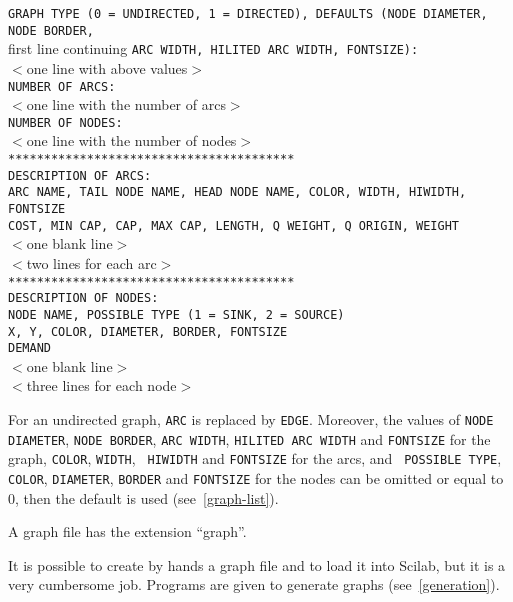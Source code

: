 \documentclass[11pt]{article}
\begin{document}
{\small \begin{tabbing}
\texttt{GRAPH TYPE (0 = UNDIRECTED, 1 = DIRECTED), DEFAULTS (NODE
DIAMETER, NODE BORDER,}\\
\qquad first line continuing \texttt{ARC WIDTH, HILITED ARC WIDTH, FONTSIZE):}\\
$<$one line with above values$>$\\
\texttt{NUMBER OF ARCS:}\\
$<$one line with the number of arcs$>$\\
\texttt{NUMBER OF NODES:}\\
$<$one line with the number of nodes$>$\\
\texttt{****************************************}\\
\texttt{DESCRIPTION OF ARCS:}\\
\texttt{ARC NAME, TAIL NODE NAME, HEAD NODE NAME, COLOR, WIDTH, HIWIDTH, FONTSIZE}\\
\texttt{COST, MIN CAP, CAP, MAX CAP, LENGTH, Q WEIGHT, Q ORIGIN, WEIGHT}\\
$<$one blank line$>$\\
$<$two lines for each arc$>$\\
\texttt{****************************************}\\
\texttt{DESCRIPTION OF NODES:}\\
\texttt{NODE NAME, POSSIBLE TYPE (1 = SINK, 2 = SOURCE)}\\
\texttt{X, Y, COLOR, DIAMETER, BORDER, FONTSIZE}\\
\texttt{DEMAND}\\
$<$one blank line$>$\\
$<$three lines for each node$>$
\end{tabbing}}

For an undirected graph, \texttt{\small ARC} is replaced by
\texttt{\small EDGE}.  Moreover, the values of \texttt{\small NODE
DIAMETER}, \texttt{\small NODE BORDER}, \texttt{\small ARC WIDTH},
\texttt{\small HILITED ARC WIDTH} and \texttt{\small FONTSIZE} for the
graph, \texttt{\small COLOR}, \texttt{\small WIDTH}, \texttt{\small
HIWIDTH} and \texttt{\small FONTSIZE} for the arcs, and \texttt{\small
POSSIBLE TYPE}, \texttt{\small COLOR}, \texttt{\small DIAMETER},
\texttt{\small BORDER} and \texttt{\small FONTSIZE} for the nodes can
be omitted or equal to 0, then the default is used
(see~\ref{graph-list}).

A graph file has the extension ``graph''.

It is possible to create by hands a graph file and to load it into
Scilab, but it is a very cumbersome job. Programs are given to
generate graphs (see~\ref{generation}).
\end{document}
